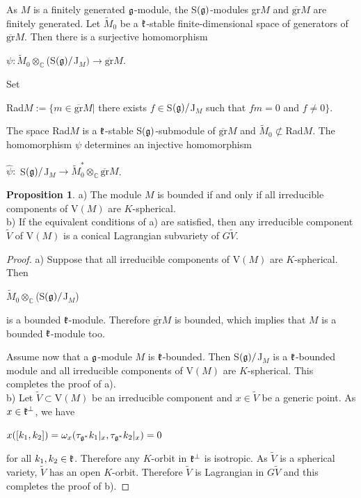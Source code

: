 \documentclass[12pt]{amsart}
\theoremstyle{definition}\newtheorem{theorem}{Theorem}[section]
\newtheorem{proposition}{Proposition}[section]
\theoremstyle{definition}\newtheorem{definition}[proposition]{Definition}
\theoremstyle{remark}\newtheorem{example}[proposition]{Example}
\renewcommand{\to}[1][]{\xrightarrow{#1}}
\begin{document}
As $M$ is a finitely generated $\frak g$-module, the S$(\frak
g)$-modules gr$M$ and $\mathrm{\overline{gr}}M$ are finitely
generated. Let $\tilde M_0$ be a $\frak k$-stable finite-dimensional
space of generators of $\mathrm{\overline{gr}}M$. Then there is a
surjective homomorphism \begin{center}$\psi: \tilde
M_0\otimes_\mathbb C$(S$(\frak
g)/$J$_M)\to\overline{\mathrm{gr}}M$.\end{center}
Set\begin{center}Rad$M:=\{m\in\overline{\mathrm{gr}}M|$ there exists
$f\in$S$(\frak g)/$J$_M$ such that $fm=0$ and  $f\ne
0\}$.\end{center} The space Rad$M$ is a $\frak k$-stable S$(\frak
g)$-submodule of $\overline{\mathrm{gr}}M$ and $\tilde
M_0\not\subset$Rad$M$. The homomorphism $\psi$ determines an
injective homomorphism
\begin{center}$\hat\psi:$ S$(\frak g)/$J$_M\to\tilde
M_0^*\otimes_\mathbb C\overline{\mathrm{gr}}M$.\end{center}
\begin{proposition}\label{Pbm}a) The module $M$ is bounded if and only if all irreducible components of $\mathrm V(M)$ are $K$-spherical.\\ b) If the equivalent conditions of a) are satisfied, then any irreducible component $\tilde V$ of $\mathrm V(M)$ is a conical Lagrangian subvariety of $G\tilde V$.\end{proposition}
\begin{proof}a) Suppose that all irreducible components of $\mathrm V(M)$ are $K$-spherical. Then \begin{center}$\tilde M_0\otimes_\mathbb C$(S$(\frak g)/$J$_M$)\end{center} is a bounded $\frak k$-module. Therefore $\overline{\mathrm{gr}}M$ is bounded, which implies that $M$ is a bounded $\frak k$-module too.

Assume now that a $\frak g$-module $M$ is $\frak k$-bounded. Then S$(\frak g)/$J$_M$ is a $\frak k$-bounded module and all irreducible components of $\mathrm V(M)$ are $K$-spherical. This completes the proof of a).\\
b) Let $\tilde V\subset\mathrm V(M)$ be an irreducible component and
$x\in\tilde V$ be a generic point. As $x\in\frak k^\bot$, we have
\begin{center}$x([k_1, k_2])=\omega_x(\tau_{\frak g^*}k_1|_x,
\tau_{\frak g^*}k_2|_x)=0$\end{center} for all $k_1, k_2\in\frak k$.
Therefore any $K$-orbit in $\frak k^\bot$ is isotropic. As $\tilde
V$ is a spherical variety, $\tilde V$ has an open $K$-orbit.
Therefore $\tilde V$ is Lagrangian in $G\tilde V$ and  this
completes the proof of b).\end{proof}
\end{document}

